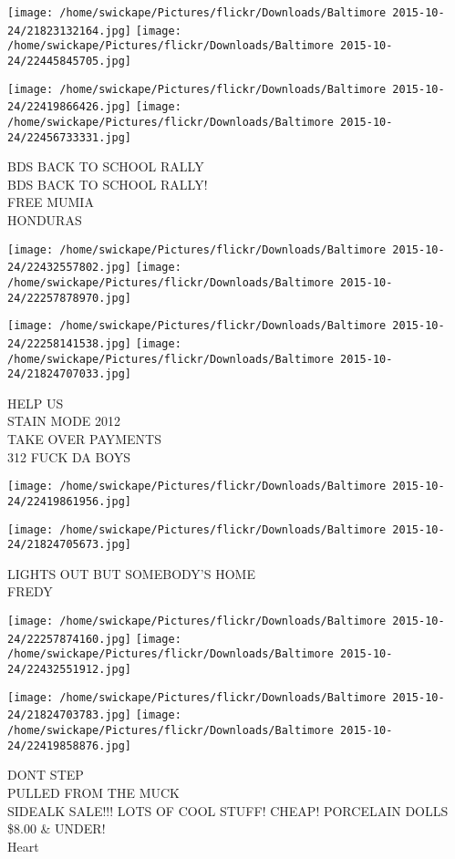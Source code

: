 \documentclass[10pt,letterpaper]{article}
\begin{document}
\texttt{[image: /home/swickape/Pictures/flickr/Downloads/Baltimore 2015-10-24/21823132164.jpg]}
\texttt{[image: /home/swickape/Pictures/flickr/Downloads/Baltimore 2015-10-24/22445845705.jpg]}

\texttt{[image: /home/swickape/Pictures/flickr/Downloads/Baltimore 2015-10-24/22419866426.jpg]}
\texttt{[image: /home/swickape/Pictures/flickr/Downloads/Baltimore 2015-10-24/22456733331.jpg]}

BDS BACK TO SCHOOL RALLY\\
BDS BACK TO SCHOOL RALLY!\\
FREE MUMIA\\
HONDURAS
\pagebreak

\texttt{[image: /home/swickape/Pictures/flickr/Downloads/Baltimore 2015-10-24/22432557802.jpg]}
\texttt{[image: /home/swickape/Pictures/flickr/Downloads/Baltimore 2015-10-24/22257878970.jpg]}

\texttt{[image: /home/swickape/Pictures/flickr/Downloads/Baltimore 2015-10-24/22258141538.jpg]}
\texttt{[image: /home/swickape/Pictures/flickr/Downloads/Baltimore 2015-10-24/21824707033.jpg]}

HELP US\\
STAIN MODE 2012\\
TAKE OVER PAYMENTS\\
312 FUCK DA BOYS
\pagebreak

\texttt{[image: /home/swickape/Pictures/flickr/Downloads/Baltimore 2015-10-24/22419861956.jpg]}

\vspace{0.25in}
\texttt{[image: /home/swickape/Pictures/flickr/Downloads/Baltimore 2015-10-24/21824705673.jpg]}

LIGHTS OUT BUT SOMEBODY'S HOME\\
FREDY
\pagebreak

\texttt{[image: /home/swickape/Pictures/flickr/Downloads/Baltimore 2015-10-24/22257874160.jpg]}
\texttt{[image: /home/swickape/Pictures/flickr/Downloads/Baltimore 2015-10-24/22432551912.jpg]}

\texttt{[image: /home/swickape/Pictures/flickr/Downloads/Baltimore 2015-10-24/21824703783.jpg]}
\texttt{[image: /home/swickape/Pictures/flickr/Downloads/Baltimore 2015-10-24/22419858876.jpg]}

DONT STEP\\
PULLED FROM THE MUCK\\
SIDEALK SALE!!!  LOTS OF COOL STUFF!  CHEAP!  PORCELAIN DOLLS \$8.00 \& UNDER!\\
Heart
\pagebreak
\end{document}
